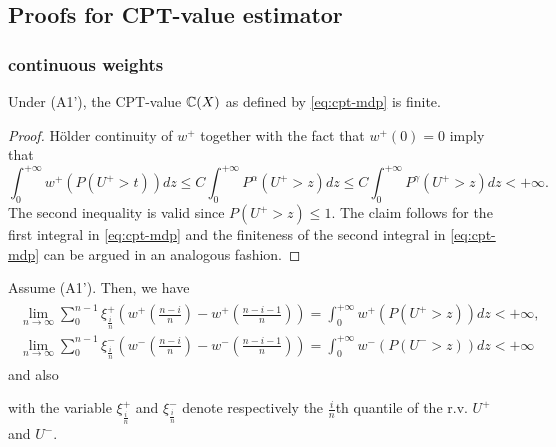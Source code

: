 

\subsection{Proofs for CPT-value estimator}
\label{appendix:cpt-est}

\subsubsection{\holder continuous weights}
\label{sec:holder-proofs}
\begin{proposition}
\label{prop:Holder-cpt-finite}
Under (A1'), the CPT-value $\mathbb{C}(X)$ as defined by \eqref{eq:cpt-mdp} is finite. 
\end{proposition}
\begin{proof}

H\"{o}lder continuity of $w^+$ together with the fact that $w^+(0)=0$ imply that 
$$
\int_0^{+\infty} w^+(P(U^+>t)) dz 
\le C \int_0^{+\infty} P^{\alpha} (U^+>z) dz
\le C \int_0^{+\infty} P^{\gamma} (U^+>z) dz 
<+\infty.
$$
The second inequality is valid since $P(U^+>z) \leq 1$. The claim follows for the first integral in \eqref{eq:cpt-mdp} and the finiteness of the second integral in \eqref{eq:cpt-mdp} can be argued in an analogous fashion.
\end{proof}

\begin{proposition}
\label{prop:holder-quantile}
Assume (A1'). Then, we have 
\begin{align}
\label{eq:simple-estimation}
\begin{split}
\lim_{n \rightarrow \infty} \sum_0^{n-1} \xi^+_{\frac{i}{n}} (w^+(\frac{n-i}{n})- w^+(\frac{n-i-1}{n}) ) = \int_0^{+\infty} w^+(P(U^+>z)) dz < +\infty,
\\
\lim_{n \rightarrow \infty} \sum_0^{n-1} \xi^-_{\frac{i}{n}} (w^-(\frac{n-i}{n})- w^-(\frac{n-i-1}{n}) ) = \int_0^{+\infty} w^-(P(U^->z)) dz < +\infty
\end{split}
\end{align}
and also

with the variable $\xi^+_{\frac{i}{n}}$ and $\xi^-_{\frac{i}{n}}$ denote respectively the $\frac{i}{n}$th quantile of the 
r.v. $U^+$ and $U^-$.
\end{proposition}

